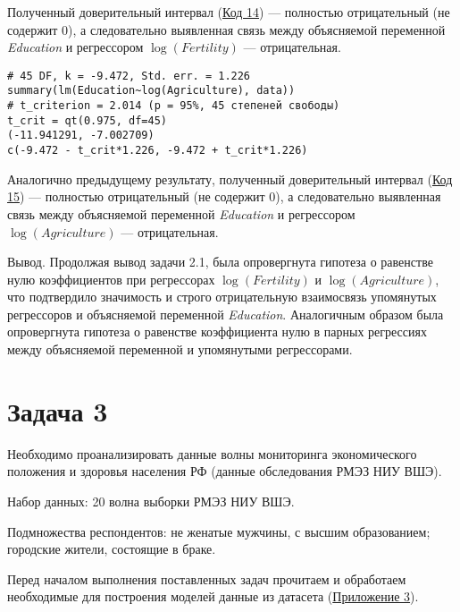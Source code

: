 Полученный доверительный интервал (\hyperref[code:14]{Код 14}) --- полностью отрицательный (не содержит 0), а следовательно выявленная связь между объясняемой переменной \textit{Education} и регрессором $\log(\textit{Fertility})$ --- отрицательная.

\begin{code}
\begin{verbatim}
# 45 DF, k = -9.472, Std. err. = 1.226
summary(lm(Education~log(Agriculture), data))
# t_criterion = 2.014 (p = 95%, 45 степеней свободы)
t_crit = qt(0.975, df=45)
(-11.941291, -7.002709)
c(-9.472 - t_crit*1.226, -9.472 + t_crit*1.226)
\end{verbatim}
\label{code:15}
\end{code}

Аналогично предыдущему результату, полученный доверительный интервал (\hyperref[code:15]{Код 15}) --- полностью отрицательный (не содержит 0), а следовательно выявленная связь между объясняемой переменной \textit{Education} и регрессором $\log(\textit{Agriculture})$ --- отрицательная.

Вывод. Продолжая вывод задачи 2.1, была опровергнута гипотеза о равенстве нулю коэффициентов при регрессорах $\log(\textit{Fertility})$ и $\log(\textit{Agriculture})$, что подтвердило значимость и строго отрицательную взаимосвязь упомянутых регрессоров и объясняемой переменной \textit{Education}. Аналогичным образом была опровергнута гипотеза о равенстве коэффициента нулю в парных регрессиях между объясняемой переменной и упомянутыми регрессорами.


\newpage
{}
\section{Задача 3}

Необходимо проанализировать данные волны мониторинга экономического положения и здоровья населения РФ (данные обследования РМЭЗ НИУ ВШЭ).

Набор данных: 20 волна выборки РМЭЗ НИУ ВШЭ.

Подмножества респондентов: не женатые мужчины, с высшим образованием; городские
жители, состоящие в браке.

Перед началом выполнения поставленных задач прочитаем и обработаем необходимые для построения моделей данные из датасета (\hyperref[appendix:3]{Приложение 3}).

